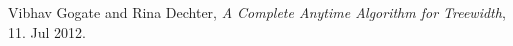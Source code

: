 \documentclass[10pt]{article}
\begin{document}

\begin{thebibliography}{99} %

 Vibhav Gogate and Rina Dechter, \emph{A Complete Anytime Algorithm for Treewidth}, 11. Jul 2012.




\end{thebibliography}

\end{document}
